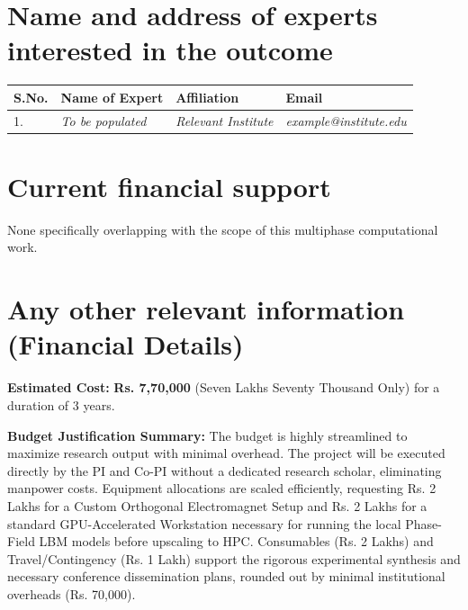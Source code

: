 \documentclass[11pt, a4paper]{article}
\begin{document}
\section{Name and address of experts interested in the outcome}
\begin{tabular}{|p{1cm}|p{4cm}|p{5cm}|p{4.5cm}|}
\hline
\textbf{S.No.} & \textbf{Name of Expert} & \textbf{Affiliation} & \textbf{Email} \\
\hline
1. & \textit{To be populated} & \textit{Relevant Institute} & \textit{example@institute.edu} \\
\hline
\end{tabular}

\section{Current financial support}
None specifically overlapping with the scope of this multiphase computational work.

\section{Any other relevant information (Financial Details)}
\textbf{Estimated Cost:} \textbf{Rs. 7,70,000} (Seven Lakhs Seventy Thousand Only) for a duration of 3 years.

\textbf{Budget Justification Summary:}
The budget is highly streamlined to maximize research output with minimal overhead. The project will be executed directly by the PI and Co-PI without a dedicated research scholar, eliminating manpower costs. Equipment allocations are scaled efficiently, requesting Rs. 2 Lakhs for a Custom Orthogonal Electromagnet Setup and Rs. 2 Lakhs for a standard GPU-Accelerated Workstation necessary for running the local Phase-Field LBM models before upscaling to HPC. Consumables (Rs. 2 Lakhs) and Travel/Contingency (Rs. 1 Lakh) support the rigorous experimental synthesis and necessary conference dissemination plans, rounded out by minimal institutional overheads (Rs. 70,000).
\end{document}
